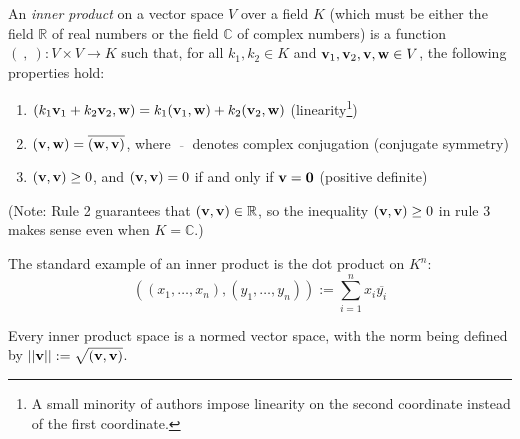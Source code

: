 \documentclass{article}
\renewcommand{\v}{{{\bf v}}}
\newcommand{\w}{{{\bf w}}}
\newcommand{\0}{{{\bf 0}}}
\begin{document}
An \emph{inner product} on a vector space $V$ over a field $K$ (which must be either the field $\mathbb{R}$ of real numbers or the field $\mathbb{C}$ of complex numbers) is a function $(\ ,\ ): V \times V \longrightarrow K$ such that, for all $k_1,k_2 \in K$ and $\v_1, \v_2, \v, \w \in V$, the following properties hold:
\begin{enumerate}
\item $(k_1 \v_1 + k_2 \v_2, \w) = k_1 (\v_1, \w) + k_2 (\v_2, \w)$ (linearity\footnote{A small minority of authors impose linearity on the second coordinate instead of the first coordinate.})
\item $(\v, \w) = \overline{(\w, \v)}$, where $\overline{\ \ \ \ }$ denotes complex conjugation (conjugate symmetry)
\item $(\v, \v) \geq 0$, and $(\v, \v) = 0$ if and only if $\v = \0$ (positive definite)
\end{enumerate}

(Note: Rule 2 guarantees that $(\v,\v) \in \mathbb{R}$, so the inequality $(\v,\v) \geq 0$ in rule 3 makes sense even when $K=\mathbb{C}$.)

The standard example of an inner product is the dot product on $K^n$:
$$
((x_1,\dots,x_n), (y_1,\dots,y_n)) := \sum_{i=1}^n x_i \overline{y_i}
$$

Every inner product space is a normed vector space, with the norm being defined by $||\v|| := \sqrt{(\v,\v)}$.
\end{document}
